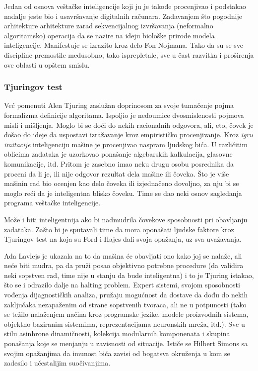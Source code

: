 \documentclass[fontsize=11bp, paper=a4]{scrartcl}
\begin{document}
Jedan od osnova veštačke inteligencije koji ju je takođe procenjivao i podstakao nadalje jeste bio i usavršavanje digitalnih računara. Zadavanjem što pogodnije arhitekture arhitekture zarad sekvencijalnog izvršavanja (neformalno algoritamsko) operacija da se nazire na ideju biološke prirode modela inteligencije. Manifestuje se izrazito kroz delo Fon Nojmana. Tako da su se sve discipline premostile međusobno, tako isprepletale, sve u čast razvitka i proširenja ove oblasti u opštem smislu.

\subsubsection{\normalsize{Tjuringov test}}
Već pomenuti Alen Tjuring zaslužan doprinosom za svoje tumačenje pojma formalizma definicije algoritama. 
Ispoljio je nedoumice dvosmislenosti pojmova misli i mišljenja. Moglo bi se doći do nekih racionalnih odgovora, ali, eto, čovek je došao do ideje da uspostavi izražavanje kroz empirističko procenjivanje.
Kroz \textit{igru imitacije} inteligenciju mašine je procenjivao naspram ljudskog bića. 
U različitim oblicima zadataka je uzorkovao ponašanje algebarskih kalkulacija, glasovne komunikacije, itd.
Pritom je zasebno imao neku drugu osobu posrednika da proceni da li je, ili nije odgovor rezultat dela mašine ili čoveka. 
Što je više mašinin rad bio ocenjen kao delo čoveka ili izjednačeno dovoljno, za nju bi se moglo reći da je inteligentna blisko čoveku. 
Time se dao neki osnov sagledanja programa veštačke inteligencije. 

Može i biti inteligentnija ako bi nadmudrila čovekove sposobnosti pri obavljanju zadataka. Zašto bi je sputavali time da mora oponašati ljudske faktore kroz Tjuringov test na koja su Ford i Hajes dali svoja opažanja, uz sva uvažavanja.

Ada Lavlejs je ukazala na to da mašina će obavljati ono kako joj se nalaže, ali neće biti mudra, pa da pruži posao objektivno potrebne procedure (da validira neki sopstven rad, time nije u stanju da bude inteligentna) i to je Tjuring istakao, što se i odrazilo dalje na halting problem.
Expert sistemi, svojom sposobnosti vođenja dijagnostičkih analiza, pružaju mogućnost da dostave da dođu do nekih zaključaka nezapaženim od strane sopstvenih tvoraca, ali ne u potpunosti (tako se težilo nalaženjem načina kroz programske jezike, modele proizvodnih sistema, objektno-baziranim sistemima, reprezentacijama neuronskih mreža, itd.). Sve u stilu asinhrone dinamičnosti, kolekcija modularnih komponenata i skupina ponašanja koje se menjanju u zavisnosti od situacije. Ističe se Hilbert Simons sa svojim opažanjima da imunost bića zavisi od bogatsva okruženja u kom se zadesilo i učestalijim suočivanjima.
\end{document}
